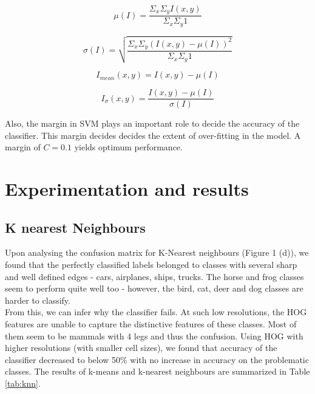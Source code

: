 \documentclass{article} %
\begin{document}
\begin{equation}
\mu(I) = \frac{\Sigma_x \Sigma_y I(x,y)}{\Sigma_x \Sigma_y 1}
\end{equation}

\begin{equation}
\sigma(I) = \sqrt{\frac{\Sigma_x \Sigma_y (I(x,y) - \mu(I))^2}{\Sigma_x \Sigma_y 1}}
\end{equation}

\begin{equation}
I_{mean}(x,y) = I(x,y) - \mu(I)
\end{equation}

\begin{equation}
I_{\sigma}(x,y) = \frac{I(x,y) - \mu(I)}{\sigma(I)}
\end{equation}

Also, the margin in SVM plays an important role to decide the accuracy of the classifier. This margin decides decides the extent of over-fitting in the model. A margin of $C=0.1$ yields optimum performance.


\section{Experimentation and results} %
\label{sub:Results}
\subsection{K nearest Neighbours}
    Upon analysing the confusion matrix for K-Nearest neighbours (Figure 1 (d)), we found that the perfectly classified labels belonged to classes with several sharp and well defined edges - cars, airplanes, ships, trucks. The horse and frog classes seem to perform quite well too - however, the bird, cat, deer and dog classes are harder to classify.\\

        From this, we can infer why the classifier fails. At such low resolutions, the HOG features are unable to capture the distinctive features of these classes. Most of them seem to be mammals with 4 legs and thus the confusion. Using HOG with higher resolutions (with smaller cell sizes), we found that accuracy of the classifier decreased to below 50\% with no increase in accuracy on the problematic classes. The results of k-means and k-nearest neighbours are summarized in Table \ref{tab:knn}.
\end{document}
